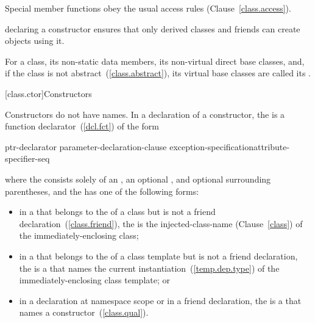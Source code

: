 \pnum
{}%
Special member functions obey the usual access rules (Clause~\ref{class.access}).
\begin{example}
declaring a constructor
ensures that only derived classes and friends can create objects using it.
\end{example}

\pnum
For a class, its non-static data members, its non-virtual direct base classes,
and, if the class is not abstract~(\ref{class.abstract}), its virtual base
classes are called its .

[class.ctor]{Constructors}%

\pnum
Constructors do not have names.
In a declaration of a constructor, the  is a
function declarator~(\ref{dcl.fct}) of the form

\begin{ncbnf}
ptr-declarator \terminal{(} parameter-declaration-clause \terminal{)} exception-specification\opt attribute-specifier-seq\opt
\end{ncbnf}

where the  consists solely of an
, an optional ,
and optional surrounding parentheses, and the  has
one of the following forms:

\begin{itemize}
\item
in a  that belongs to the
 of a class but is not a friend
declaration~(\ref{class.friend}), the  is the
injected-class-name (Clause~\ref{class}) of the immediately-enclosing class;

\item
in a  that belongs to the
 of a class template but is not a friend
declaration, the  is a  that
names the current instantiation~(\ref{temp.dep.type}) of the
immediately-enclosing class template; or

\item
in a declaration at namespace scope or in a friend declaration, the
 is a  that names a
constructor~(\ref{class.qual}).
\end{itemize}

